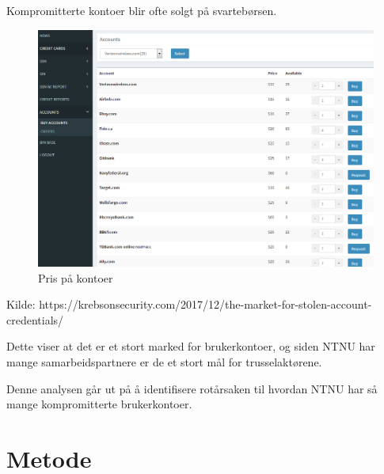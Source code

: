 Kompromitterte kontoer blir ofte solgt på svartebørsen. 
\begin{figure}[H]
    \centering
    \includegraphics[scale=0.4]{case_2/bilder/prislite_kontore.png}
    \caption[pris-kontoer]{Pris på kontoer}
    \label{fig:pris-kontoer}
\end{figure}
Kilde: https://krebsonsecurity.com/2017/12/the-market-for-stolen-account-credentials/


Dette viser at det er et stort marked for brukerkontoer, og siden NTNU har mange samarbeidspartnere er de et stort mål for trusselaktørene. 


Denne analysen går ut på å identifisere rotårsaken til hvordan NTNU har så mange kompromitterte brukerkontoer.


\section{Metode}

